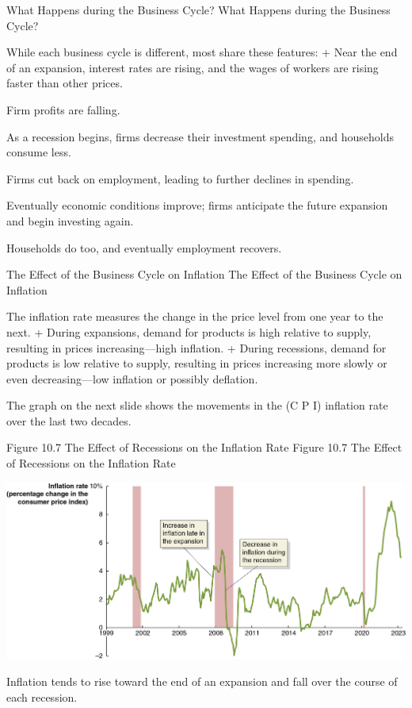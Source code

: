 \documentclass[
  12pt,
  ignorenonframetext,
]{beamer}
\begin{document}
\begin{frame}{What Happens during the Business Cycle?}
\label{what-happens-during-the-business-cycle}
What Happens during the Business Cycle?

While each business cycle is different, most share these features: +
Near the end of an expansion, interest rates are rising, and the wages
of workers are rising faster than other prices.

Firm profits are falling.

As a recession begins, firms decrease their investment spending, and
households consume less.

Firms cut back on employment, leading to further declines in spending.

Eventually economic conditions improve; firms anticipate the future
expansion and begin investing again.

Households do too, and eventually employment recovers.
\end{frame}

\begin{frame}{The Effect of the Business Cycle on Inflation}
\label{the-effect-of-the-business-cycle-on-inflation}
The Effect of the Business Cycle on Inflation

The inflation rate measures the change in the price level from one year
to the next. + During expansions, demand for products is high relative
to supply, resulting in prices increasing---high inflation. + During
recessions, demand for products is low relative to supply, resulting in
prices increasing more slowly or even decreasing---low inflation or
possibly deflation.

The graph on the next slide shows the movements in the (C P I) inflation
rate over the last two decades.
\end{frame}

\begin{frame}{Figure 10.7 The Effect of Recessions on the Inflation
Rate}
\label{figure-10.7-the-effect-of-recessions-on-the-inflation-rate}
Figure 10.7 The Effect of Recessions on the Inflation Rate

\includegraphics[width=\textwidth,height=0.99\textheight]{imgs3/img_slide40a.png}

Inflation tends to rise toward the end of an expansion and fall over the
course of each recession.
\end{frame}
\end{document}

